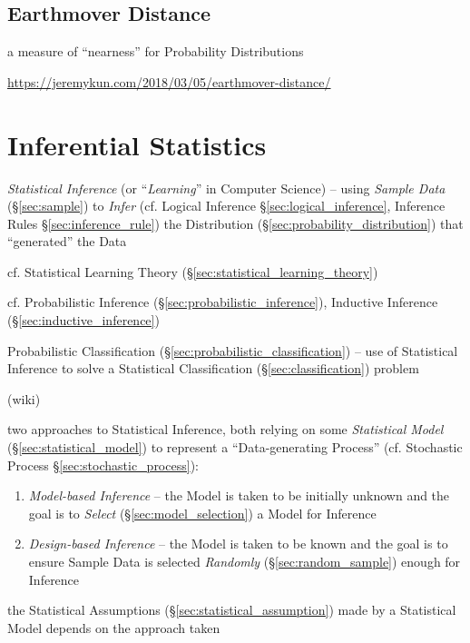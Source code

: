 \subsection{Earthmover Distance}\label{sec:earthmover_distance}


a measure of ``nearness'' for Probability Distributions

\url{https://jeremykun.com/2018/03/05/earthmover-distance/}



\section{Inferential Statistics}\label{sec:inferential_statistics}

\emph{Statistical Inference} (or ``\emph{Learning}'' in Computer Science) --
using \emph{Sample Data} (\S\ref{sec:sample}) to \emph{Infer} (cf. Logical
Inference \S\ref{sec:logical_inference}, Inference Rules
\S\ref{sec:inference_rule}) the Distribution
(\S\ref{sec:probability_distribution}) that ``generated'' the Data

\fist cf. Statistical Learning Theory (\S\ref{sec:statistical_learning_theory})

\fist cf. Probabilistic Inference
(\S\ref{sec:probabilistic_inference}), Inductive Inference
(\S\ref{sec:inductive_inference})

\fist Probabilistic Classification (\S\ref{sec:probabilistic_classification}) --
use of Statistical Inference to solve a Statistical Classification
(\S\ref{sec:classification}) problem

(wiki)

two approaches to Statistical Inference, both relying on some \emph{Statistical
  Model} (\S\ref{sec:statistical_model}) to represent a ``Data-generating
Process'' (cf. Stochastic Process \S\ref{sec:stochastic_process}):
\begin{enumerate}
  \item \emph{Model-based Inference} -- the Model is taken to be initially
    unknown and the goal is to \emph{Select} (\S\ref{sec:model_selection}) a
    Model for Inference
  \item \emph{Design-based Inference} -- the Model is taken to be known and the
    goal is to ensure Sample Data is selected \emph{Randomly}
    (\S\ref{sec:random_sample}) enough for Inference
\end{enumerate}
the Statistical Assumptions (\S\ref{sec:statistical_assumption}) made by a
Statistical Model depends on the approach taken

